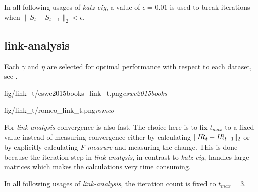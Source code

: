 In all following usages of \textit{katz-eig}, a value of $\epsilon = 0.01$ is used to break iterations when $\|S_t - S_{t - 1}\|_2 < \epsilon$.

\newpage


\subsection{link-analysis}\label{sec:training:link}

Each $\gamma$ and $\eta$ are selected for optimal performance with respect to each dataset, see .

{fig/link_t/eswc2015books_link_t.png}{\textit{eswc2015books}}

{fig/link_t/romeo_link_t.png}{\textit{romeo}}

For \textit{link-analysis} convergence is also fast. The choice here is to fix $t_{max}$ to a fixed value instead of measuring convergence either by calculating $\| \mathit{IR}_t - \mathit{IR}_{t - 1} \|_2$
or by explicitly calculating \textit{F-measure} and measuring the change. This is done because the iteration step in \textit{link-analysis}, in contrast to \textit{katz-eig}, handles large matrices which makes the calculations very time consuming.

In all following usages of \textit{link-analysis}, the iteration count is fixed to $t_{max} = 3$.

